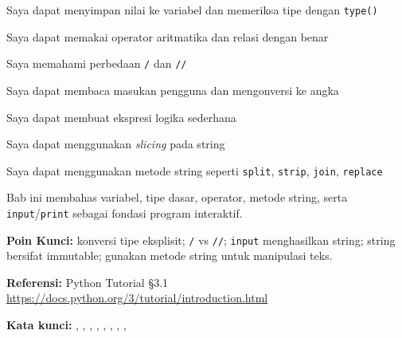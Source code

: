 \documentclass[../main.tex]{subfiles}
\begin{document}
\begin{checklist}
  \item Saya dapat menyimpan nilai ke variabel dan memeriksa tipe dengan \texttt{type()}
  \item Saya dapat memakai operator aritmatika dan relasi dengan benar
  \item Saya memahami perbedaan \texttt{/} dan \texttt{//}
  \item Saya dapat membaca masukan pengguna dan mengonversi ke angka
  \item Saya dapat membuat ekspresi logika sederhana
  \item Saya dapat menggunakan \textit{slicing} pada string
  \item Saya dapat menggunakan metode string seperti \texttt{split}, \texttt{strip}, \texttt{join}, \texttt{replace}
\end{checklist}

\begin{rangkuman}
Bab ini membahas variabel, tipe dasar, operator, metode string, serta \texttt{input}/\texttt{print} sebagai fondasi program interaktif.

\textbf{Poin Kunci:} konversi tipe eksplisit; \texttt{/} vs \texttt{//}; \texttt{input} menghasilkan string; string bersifat immutable; gunakan metode string untuk manipulasi teks.

\textbf{Referensi:} {\small Python Tutorial §3.1 \url{https://docs.python.org/3/tutorial/introduction.html}}

\textbf{Kata kunci:} , , , , , , , , 
\end{rangkuman}
\end{document}
